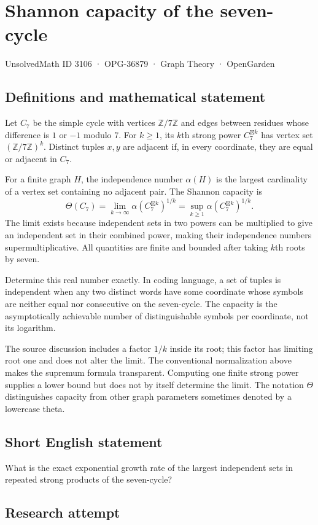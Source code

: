 \documentclass[11pt,a4paper]{article}
\begin{document}
\section*{Shannon capacity of the seven-cycle}\label{3106}
{\small UnsolvedMath ID 3106 · OPG-36879 · Graph Theory · OpenGarden}
\subsection{Definitions and mathematical statement}
Let $C_7$ be the simple cycle with vertices $\mathbb Z/7\mathbb Z$ and
edges between residues whose difference is $1$ or $-1$ modulo $7$.
For $k\ge1$, its $k$th strong power $C_7^{\boxtimes k}$ has vertex set
$(\mathbb Z/7\mathbb Z)^k$. Distinct tuples $x,y$ are adjacent if,
in every coordinate, they are equal or adjacent in $C_7$.

For a finite graph $H$, the independence number $\alpha(H)$ is the
largest cardinality of a vertex set containing no adjacent pair.
The Shannon capacity is
\[
 \Theta(C_7)=\lim_{k\to\infty}
       \alpha(C_7^{\boxtimes k})^{1/k}
       =\sup_{k\ge1}\alpha(C_7^{\boxtimes k})^{1/k}.
\]
The limit exists because independent sets in two powers can be multiplied
to give an independent set in their combined power, making their
independence numbers supermultiplicative. All quantities are finite and
bounded after taking $k$th roots by seven.

Determine this real number exactly. In coding language, a set of tuples
is independent when any two distinct words have some coordinate whose
symbols are neither equal nor consecutive on the seven-cycle.
The capacity is the asymptotically achievable number of distinguishable
symbols per coordinate, not its logarithm.

The source discussion includes a factor $1/k$ inside its root; this
factor has limiting root one and does not alter the limit. The conventional
normalization above makes the supremum formula transparent. Computing one
finite strong power supplies a lower bound but does not by itself
determine the limit. The notation $\Theta$ distinguishes capacity from
other graph parameters sometimes denoted by a lowercase theta.
\subsection{Short English statement}
What is the exact exponential growth rate of the largest independent sets in repeated strong products of the seven-cycle?
\subsection{Research attempt}
\end{document}
